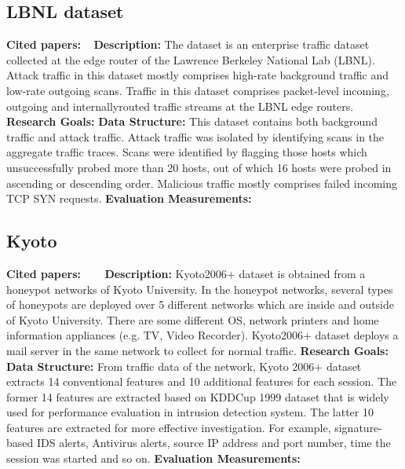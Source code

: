 \subsection{LBNL dataset}
\textbf{Cited papers:} ~\cite{ashfaq2008comparative}\newline
\textbf{Description:} The dataset is an enterprise traffic dataset collected at the edge router of the Lawrence Berkeley National Lab (LBNL). Attack traffic in this dataset mostly comprises high-rate background traffic and low-rate outgoing scans. Traffic in this dataset comprises packet-level incoming, outgoing and internallyrouted traffic streams at the LBNL edge routers.\newline
\textbf{Research Goals:}  \newline
\textbf{Data Structure:} This dataset contains both background traffic and attack traffic. Attack traffic was isolated by identifying scans in the aggregate traffic traces. Scans were identified by flagging those hosts which unsuccessfully
probed more than 20 hosts, out of which 16 hosts were probed in ascending or descending order. Malicious traffic mostly comprises failed incoming TCP SYN requests. \newline
\textbf{Evaluation Measurements:} \newline



\subsection{Kyoto}
\textbf{Cited papers:} ~\cite{song2011statistical}~\cite{sato2012unknown}~\cite{chitrakar2012anomaly}\newline
\textbf{Description:} Kyoto2006+ dataset is obtained from a honeypot networks of Kyoto University. In the honeypot networks, several types of honeypots are deployed over 5 different networks which are inside and outside of Kyoto University. There are some different OS, network printers and home information appliances (e.g. TV, Video Recorder). Kyoto2006+ dataset deploys a mail server in the same network to collect for normal traffic.\newline
\textbf{Research Goals:}  \newline
\textbf{Data Structure:} From traffic data of the network, Kyoto 2006+ dataset extracts 14 conventional features and 10 additional features for each session. The former 14 features are extracted based on KDDCup 1999 dataset that is widely used for performance evaluation in intrusion detection system. The latter 10 features are extracted for more effective investigation. For example, signature-based IDS alerts, Antivirus alerts, source IP address and port number, time the session was started and so on. \newline
\textbf{Evaluation Measurements:} \newline



